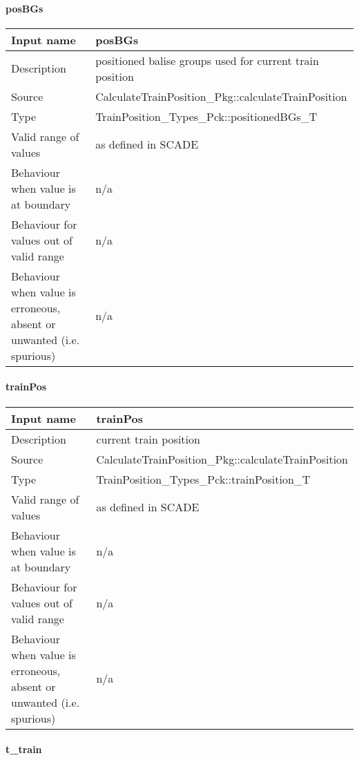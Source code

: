 \paragraph{posBGs}

\begin{longtable}{p{}p{}}
\toprule
Input name				& posBGs \\
\midrule
Description				& positioned balise groups used for current train position \\
\midrule
Source					& CalculateTrainPosition\_Pkg::calculateTrainPosition \\ 
\midrule
Type					& TrainPosition\_Types\_Pck::positionedBGs\_T \\
\midrule
Valid range of values	& as defined in SCADE \\
\midrule
Behaviour when value is at boundary	& n/a \\
\midrule
Behaviour for values out of valid range	& n/a \\
\midrule
Behaviour when value is erroneous, absent or unwanted (i.e. spurious) & n/a \\
\bottomrule
\end{longtable}

\paragraph{trainPos}

\begin{longtable}{p{}p{}}
\toprule
Input name				& trainPos \\
\midrule
Description				& current train position \\
\midrule
Source					& CalculateTrainPosition\_Pkg::calculateTrainPosition \\ 
\midrule
Type					& TrainPosition\_Types\_Pck::trainPosition\_T \\
\midrule
Valid range of values	& as defined in SCADE \\
\midrule
Behaviour when value is at boundary	& n/a \\
\midrule
Behaviour for values out of valid range	& n/a \\
\midrule
Behaviour when value is erroneous, absent or unwanted (i.e. spurious) & n/a \\
\bottomrule
\end{longtable}

\paragraph{t\_train}

